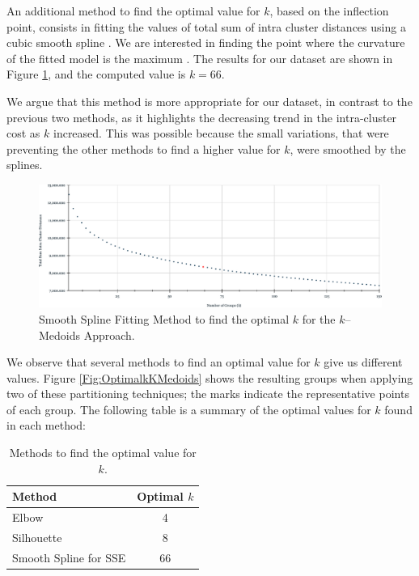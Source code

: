 An additional method to find the optimal value for $k$, based on the inflection point, consists in fitting the values of total sum of intra cluster distances using a cubic smooth spline \cite{HastieTF2009}. We are interested in finding the point where the curvature of the fitted model is the maximum \cite{Akima1970}. The results for our dataset are shown in Figure \ref{Fig:SmoothSpline-kMedoids}, and the computed value is $k = 66$.

We argue that this method is more appropriate for our dataset, in contrast to the previous two methods, as it highlights the decreasing trend in the intra-cluster cost as $k$ increased. This was possible because the small variations, that were preventing the other methods to find a higher value for $k$, were smoothed by the splines.

\begin{figure}[h]
	\centering
	\includegraphics[scale=0.5]{../Figures/SmoothSpline-kMedoids}
	\caption{Smooth Spline Fitting Method to find the optimal $k$ for the $k$--Medoids Approach.}
	\label{Fig:SmoothSpline-kMedoids}
\end{figure}

We observe that several methods to find an optimal value for $k$ give us different values. Figure \ref{Fig:OptimalkKMedoids} shows the resulting groups when applying two of these partitioning techniques; the marks indicate the representative points of each group. %
The following table is a summary of the optimal values for $k$ found in each method:
\begin{table}[h]
	\centering
	\tiny
	\begin{tabular}{|l|c|}
		\hline
		Method & Optimal $k$ \\ \hline
		Elbow  & 4	\\
		Silhouette & 8	\\
		Smooth Spline for SSE & 66\\ \hline
	\end{tabular}
\caption{Methods to find the optimal value for $k$.}
\label{Table:ValidationIndex}
\end{table}
		
